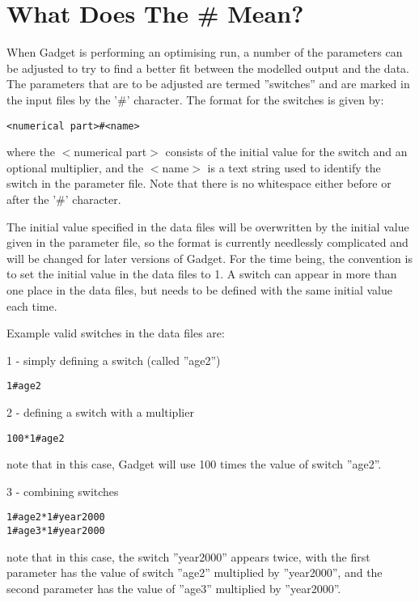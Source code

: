 \documentclass [a4paper, 10pt]{book}
\begin{document}
\section{What Does The \# Mean?}\label{sec:whatdoeshash}
When Gadget is performing an optimising run, a number of the parameters can be adjusted to try to find a better fit between the modelled output and the data.  The parameters that are to be adjusted are termed ''switches'' and are marked in the input files by the '\#' character.  The format for the switches is given by:

\begin{verbatim}
<numerical part>#<name>
\end{verbatim}

where the $<$numerical part$>$ consists of the initial value for the switch and an optional multiplier, and the $<$name$>$ is a text string used to identify the switch in the parameter file.  Note that there is no whitespace either before or after the '\#' character.

\bigskip
The initial value specified in the data files will be overwritten by the initial value given in the parameter file, so the format is currently needlessly complicated and will be changed for later versions of Gadget.  For the time being, the convention is to set the initial value in the data files to 1.  A switch can appear in more than one place in the data files, but needs to be defined with the same initial value each time.

\bigskip
Example valid switches in the data files are:\newline

1 - simply defining a switch (called ''age2'')
\begin{verbatim}
1#age2
\end{verbatim}

2 - defining a switch with a multiplier
\begin{verbatim}
100*1#age2
\end{verbatim}
note that in this case, Gadget will use 100 times the value of switch ''age2''.\newline

3 - combining switches
\begin{verbatim}
1#age2*1#year2000
1#age3*1#year2000
\end{verbatim}
note that in this case, the switch ''year2000'' appears twice, with the first parameter has the value of switch ''age2'' multiplied by ''year2000'', and the second parameter has the value of ''age3'' multiplied by ''year2000''.
\end{document}
